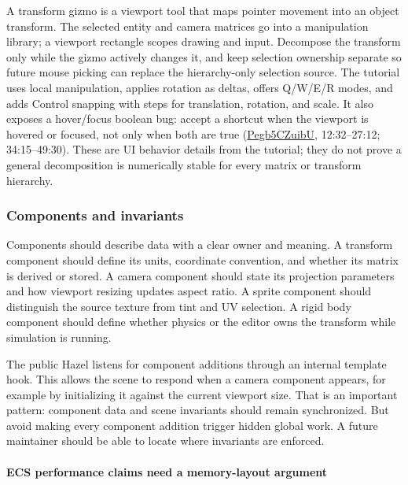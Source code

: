 A transform gizmo is a viewport tool that maps pointer movement into an object transform. The selected entity and camera matrices go into a manipulation library; a viewport rectangle scopes drawing and input. Decompose the transform only while the gizmo actively changes it, and keep selection ownership separate so future mouse picking can replace the hierarchy-only selection source. The tutorial uses local manipulation, applies rotation as deltas, offers Q/W/E/R modes, and adds Control snapping with steps for translation, rotation, and scale. It also exposes a hover/focus boolean bug: accept a shortcut when the viewport is hovered or focused, not only when both are true (\href{https://www.youtube.com/watch?v=Pegb5CZuibU}{Pegb5CZuibU}, 12:32--27:12; 34:15--49:30). These are UI behavior details from the tutorial; they do not prove a general decomposition is numerically stable for every matrix or transform hierarchy.

\subsubsection{Components and invariants}\label{06-engine-ii-ch031-components-and-invariants}

\hypertarget{06-engine-ii-ch031-components-and-invariants}{}

Components should describe data with a clear owner and meaning. A transform component should define its units, coordinate convention, and whether its matrix is derived or stored. A camera component should state its projection parameters and how viewport resizing updates aspect ratio. A sprite component should distinguish the source texture from tint and UV selection. A rigid body component should define whether physics or the editor owns the transform while simulation is running.

The public Hazel  listens for component additions through an internal template hook. This allows the scene to respond when a camera component appears, for example by initializing it against the current viewport size. That is an important pattern: component data and scene invariants should remain synchronized. But avoid making every component addition trigger hidden global work. A future maintainer should be able to locate where invariants are enforced.

\paragraph{ECS performance claims need a memory-layout argument}\label{06-engine-ii-ch031-ecs-performance-claims-need-a-memory-layout-argument}

